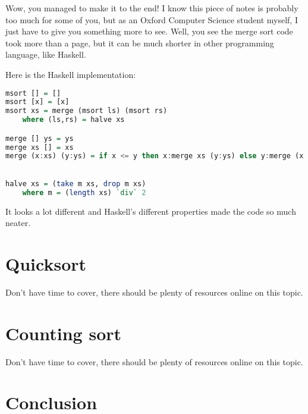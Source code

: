 Wow, you managed to make it to the end! I know this piece of notes is probably too much for some of you, but as an Oxford Computer Science student myself, I just have to give you something more to see. Well, you see the merge sort code took more than a page, but it can be much shorter in other programming language, like Haskell. 

Here is the Haskell implementation:

\begin{lstlisting}[language=Haskell]
msort [] = []
msort [x] = [x]
msort xs = merge (msort ls) (msort rs)
    where (ls,rs) = halve xs

merge [] ys = ys
merge xs [] = xs
merge (x:xs) (y:ys) = if x <= y then x:merge xs (y:ys) else y:merge (x:xs) ys
    

halve xs = (take m xs, drop m xs)
    where m = (length xs) `div` 2

\end{lstlisting}

It looks a lot different and Haskell's different properties made the code so much neater.

\section{Quicksort}

Don't have time to cover, there should be plenty of resources online on this topic.

\section{Counting sort}

Don't have time to cover, there should be plenty of resources online on this topic.

\section{Conclusion}

